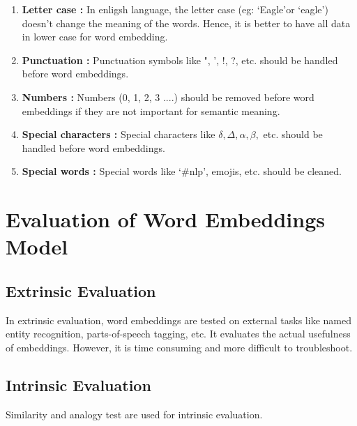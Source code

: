 \begin{enumerate}
    \item \textbf{Letter case :}
          In enligsh language, the letter case (eg: \lq Eagle\rq or \lq eagle\rq) doesn't change the meaning of the words. Hence, it is better to have all data in lower case for word embedding.

    \item \textbf{Punctuation :}
          Punctuation symbols like ", ', !, ?, etc. should be handled before word embeddings.

    \item \textbf{Numbers :}
          Numbers (0, 1, 2, 3 ....) should be removed before word embeddings if they are not important for semantic meaning.

    \item \textbf{Special characters :}
          Special characters like $\delta , \Delta , \alpha , \beta , $ etc. should be handled before word embeddings.

    \item \textbf{Special words :}
          Special words like \lq\#nlp\rq, emojis, etc. should be cleaned.
\end{enumerate}

\section{Evaluation of Word Embeddings Model}
\subsection{Extrinsic Evaluation}
In extrinsic evaluation, word embeddings are tested on external tasks like named entity recognition, parts-of-speech tagging, etc. It evaluates the actual usefulness of embeddings. However, it is time consuming and more difficult to troubleshoot.

\subsection{Intrinsic Evaluation}
Similarity and analogy test are used for intrinsic evaluation. 




